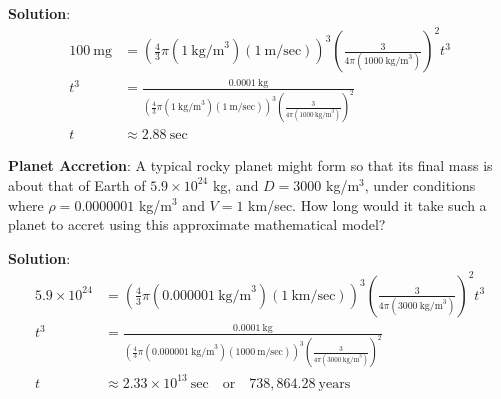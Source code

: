 \documentclass[12pt]{article}
\begin{document}
\medskip

\textbf{Solution}:
\begin{align}
100~\text{mg} &= \left(\frac{4}{3} \pi \left(1~\text{kg/m}^3\right) \left(1~\text{m/sec}\right)\right)^3 \left(\frac{3}{4 \pi \left(1000~\text{kg/m}^3\right)}\right)^2 t^3 \\
t^3 &= \frac{0.0001~\text{kg}}{\left(\frac{4}{3} \pi \left(1~\text{kg/m}^3\right) \left(1~\text{m/sec}\right)\right)^3 \left(\frac{3}{4 \pi \left(1000~\text{kg/m}^3\right)}\right)^2} \\
t &\approx 2.88~\text{sec}
\end{align}

\medskip

\textbf{Planet Accretion}:  A typical rocky planet might form so that its final mass is about that of Earth of $5.9 \times 10^{24}$ kg, and $D = 3000$ kg/m$^3$, under conditions where $\rho = 0.0000001$ kg/m$^3$ and $V = 1$ km/sec. How long would it take such a planet to accret using this approximate mathematical model?

\medskip

\textbf{Solution}:
\begin{align}
5.9 \times 10^{24} &= \left(\frac{4}{3} \pi \left(0.000001~\text{kg/m}^3\right) \left(1~\text{km/sec}\right)\right)^3 \left(\frac{3}{4 \pi \left(3000~\text{kg/m}^3\right)}\right)^2 t^3 \\
t^3 &= \frac{0.0001~\text{kg}}{\left(\frac{4}{3} \pi \left(0.000001~\text{kg/m}^3\right) \left(1000~\text{m/sec}\right)\right)^3 \left(\frac{3}{4 \pi \left(3000~\text{kg/m}^3\right)}\right)^2} \\
t &\approx 2.33 \times 10^{13}~\text{sec} \quad \text{or} \quad 738,864.28~\text{years}
\end{align}

\medskip
\end{document}
